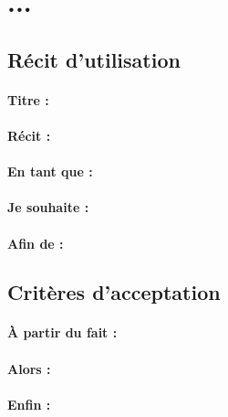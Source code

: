 \section{...} %

\subsection*{Récit d'utilisation}

\paragraph{Titre : } %
\paragraph{Récit : } %
\paragraph{En tant que : } %
\paragraph{Je souhaite : } %
\paragraph{Afin de : } %

\subsection*{Critères d'acceptation}

\paragraph{À partir du fait : } %
\paragraph{Alors : } %
\paragraph{Enfin : } %